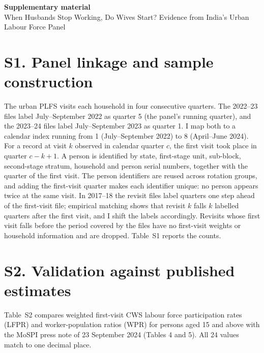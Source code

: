 \begin{center}{\Large\bfseries Supplementary material}\\[0.5em] When Husbands Stop Working, Do Wives Start? Evidence from India's Urban Labour Force Panel\end{center}

\section*{S1. Panel linkage and sample construction}
The urban PLFS visits each household in four consecutive quarters. The 2022--23 files label July--September 2022 as quarter 5 (the panel's running quarter), and the 2023--24 files label July--September 2023 as quarter 1. I map both to a calendar index running from 1 (July--September 2022) to 8 (April--June 2024). For a record at visit $k$ observed in calendar quarter $c$, the first visit took place in quarter $c-k+1$. A person is identified by state, first-stage unit, sub-block, second-stage stratum, household and person serial numbers, together with the quarter of the first visit. The person identifiers are reused across rotation groups, and adding the first-visit quarter makes each identifier unique: no person appears twice at the same visit. In 2017--18 the revisit files label quarters one step ahead of the first-visit file; empirical matching shows that revisit $k$ falls $k$ labelled quarters after the first visit, and I shift the labels accordingly. Revisits whose first visit falls before the period covered by the files have no first-visit weights or household information and are dropped. Table~S1 reports the counts.

\begin{table}[htbp]\centering\caption*{Table S1: Panel linkage and sample construction}\small
\end{table}

\section*{S2. Validation against published estimates}
Table~S2 compares weighted first-visit CWS labour force participation rates (LFPR) and worker-population ratios (WPR) for persons aged 15 and above with the MoSPI press note of 23 September 2024 (Tables 4 and 5). All 24 values match to one decimal place.

\begin{table}[htbp]\centering\caption*{Table S2: Reproduced and published CWS estimates, persons aged 15 and above}\small
\end{table}

